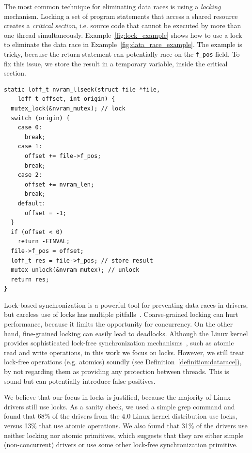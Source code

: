 The most common technique for eliminating data races is using a \emph{locking} mechanism. Locking a set of program statements that access a shared resource creates a \emph{critical section}, i.e. source code that cannot be executed by more than one thread simultaneously. Example~\ref{fig:lock_example} shows how to use a lock to eliminate the data race in Example~\ref{fig:data_race_example}. The example is tricky, because the return statement can potentially race on the \texttt{f\_pos} field. To fix this issue, we store the result in a temporary variable, inside the critical section.

\begin{lstlisting}[caption = Using a lock to eliminate the data races., label = fig:lock_example]
static loff_t nvram_llseek(struct file *file,
    loff_t offset, int origin) {
  mutex_lock(&nvram_mutex); // lock
  switch (origin) {
    case 0:
      break;
    case 1:
      offset += file->f_pos;
      break;
    case 2:
      offset += nvram_len;
      break;
    default:
      offset = -1;
  }
  if (offset < 0)
    return -EINVAL;
  file->f_pos = offset;
  loff_t res = file->f_pos; // store result
  mutex_unlock(&nvram_mutex); // unlock
  return res;
}
\end{lstlisting}

Lock-based synchronization is a powerful tool for preventing data races in drivers, but careless use of locks has multiple pitfalls~\cite{sutter2005software}. Coarse-grained locking can hurt performance, because it limits the opportunity for concurrency. On the other hand, fine-grained locking can easily lead to deadlocks. Although the Linux kernel provides sophisticated lock-free synchronization mechanisms~\cite{corbet2005linux}, such as atomic read and write operations, in this work we focus on locks. However, we still treat lock-free operations (e.g. atomics) soundly (see Definition~\ref{definition:datarace}), by not regarding them as providing any protection between threads. This is sound but can potentially introduce false positives.

We believe that our focus in locks is justified, because the majority of Linux drivers still use locks. As a sanity check, we used a simple grep command and found that 68\% of the drivers from the 4.0 Linux kernel distribution use locks, versus 13\% that use atomic operations. We also found that 31\% of the drivers use neither locking nor atomic primitives, which suggests that they are either simple (non-concurrent) drivers or use some other lock-free synchronization primitive.

